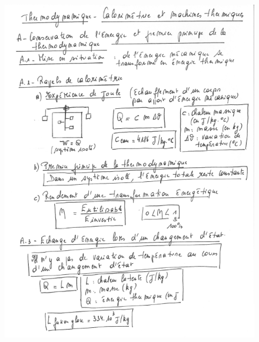 \begin{figure}
\centering
\includegraphics[width=18.486cm,height=24.576cm]{Pictures/1000000100000244000003044E80AD546388D528.png}
\caption{}
\end{figure}


